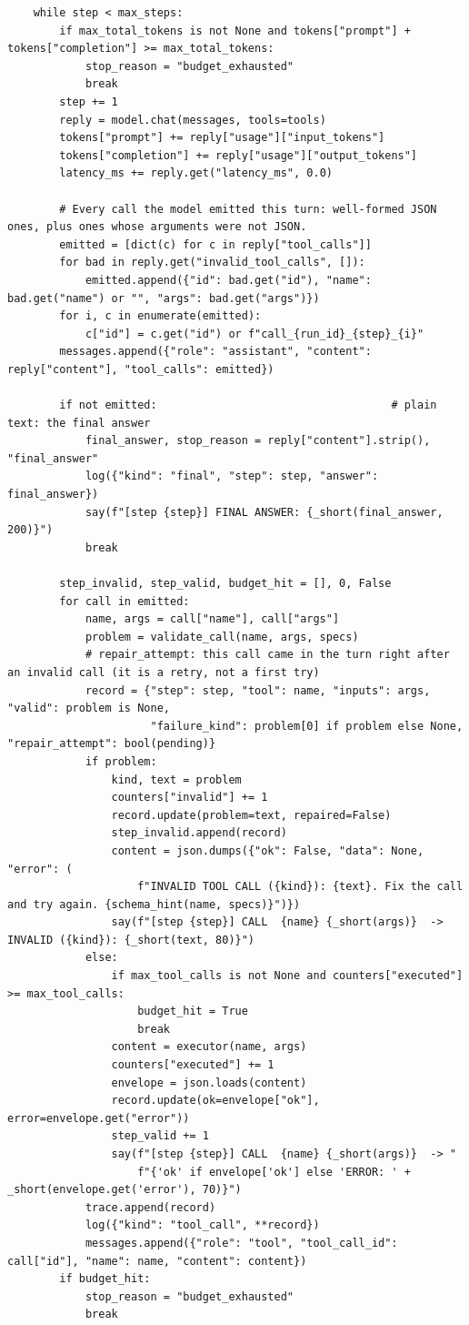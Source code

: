 \documentclass[11pt]{article}
\begin{document}
\begin{lstlisting}
    while step < max_steps:
        if max_total_tokens is not None and tokens["prompt"] + tokens["completion"] >= max_total_tokens:
            stop_reason = "budget_exhausted"
            break
        step += 1
        reply = model.chat(messages, tools=tools)
        tokens["prompt"] += reply["usage"]["input_tokens"]
        tokens["completion"] += reply["usage"]["output_tokens"]
        latency_ms += reply.get("latency_ms", 0.0)

        # Every call the model emitted this turn: well-formed JSON ones, plus ones whose arguments were not JSON.
        emitted = [dict(c) for c in reply["tool_calls"]]
        for bad in reply.get("invalid_tool_calls", []):
            emitted.append({"id": bad.get("id"), "name": bad.get("name") or "", "args": bad.get("args")})
        for i, c in enumerate(emitted):
            c["id"] = c.get("id") or f"call_{run_id}_{step}_{i}"
        messages.append({"role": "assistant", "content": reply["content"], "tool_calls": emitted})

        if not emitted:                                    # plain text: the final answer
            final_answer, stop_reason = reply["content"].strip(), "final_answer"
            log({"kind": "final", "step": step, "answer": final_answer})
            say(f"[step {step}] FINAL ANSWER: {_short(final_answer, 200)}")
            break

        step_invalid, step_valid, budget_hit = [], 0, False
        for call in emitted:
            name, args = call["name"], call["args"]
            problem = validate_call(name, args, specs)
            # repair_attempt: this call came in the turn right after an invalid call (it is a retry, not a first try)
            record = {"step": step, "tool": name, "inputs": args, "valid": problem is None,
                      "failure_kind": problem[0] if problem else None, "repair_attempt": bool(pending)}
            if problem:
                kind, text = problem
                counters["invalid"] += 1
                record.update(problem=text, repaired=False)
                step_invalid.append(record)
                content = json.dumps({"ok": False, "data": None, "error": (
                    f"INVALID TOOL CALL ({kind}): {text}. Fix the call and try again. {schema_hint(name, specs)}")})
                say(f"[step {step}] CALL  {name} {_short(args)}  -> INVALID ({kind}): {_short(text, 80)}")
            else:
                if max_tool_calls is not None and counters["executed"] >= max_tool_calls:
                    budget_hit = True
                    break
                content = executor(name, args)
                counters["executed"] += 1
                envelope = json.loads(content)
                record.update(ok=envelope["ok"], error=envelope.get("error"))
                step_valid += 1
                say(f"[step {step}] CALL  {name} {_short(args)}  -> "
                    f"{'ok' if envelope['ok'] else 'ERROR: ' + _short(envelope.get('error'), 70)}")
            trace.append(record)
            log({"kind": "tool_call", **record})
            messages.append({"role": "tool", "tool_call_id": call["id"], "name": name, "content": content})
        if budget_hit:
            stop_reason = "budget_exhausted"
            break


\end{lstlisting}
\end{document}
